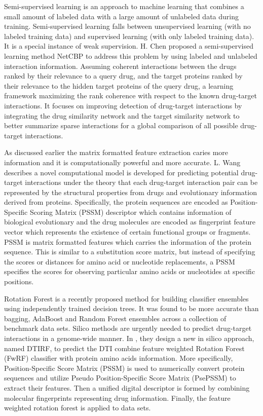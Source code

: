 \documentclass[conference]{IEEEtran}
\begin{document}
Semi-supervised learning is an approach to machine learning that combines a small amount of labeled data with a large amount of unlabeled data during training. Semi-supervised learning falls between unsupervised learning (with no labeled training data) and supervised learning (with only labeled training data). It is a special instance of weak supervision. H. Chen \cite{b1} proposed a semi-supervised learning method NetCBP to address this problem by using labeled and unlabeled interaction information. Assuming coherent interactions between the drugs ranked by their relevance to a query drug, and the target proteins ranked by their relevance to the hidden target proteins of the query drug, a learning framework maximizing the rank coherence with respect to the known drug-target interactions. It focuses on improving detection of drug-target interactions by integrating the drug similarity network and the target similarity network to better summarize sparse interactions for a global comparison of all possible drug-target interactions.

As discussed earlier the matrix formatted feature extraction caries more information and it is computationally powerful and more accurate. L. Wang \cite{b5} describes a novel computational model is developed for predicting potential drug-target interactions under the theory that each drug-target interaction pair can be represented by the structural properties from drugs and evolutionary information derived from proteins. Specifically, the protein sequences are encoded as Position-Specific Scoring Matrix (PSSM) descriptor which contains information of biological evolutionary and the drug molecules are encoded as fingerprint feature vector which represents the existence of certain functional groups or fragments. PSSM is matrix formatted features which carries the information of the protein sequence. This is similar to a substitution score matrix, but instead of specifying the scores or distances for amino acid or nucleotide replacements, a PSSM specifies the scores for observing particular amino acids or nucleotides at specific positions.

Rotation Forest is a recently proposed method for building classifier ensembles using independently trained decision trees. It was found to be more accurate than bagging, AdaBoost and Random Forest ensembles across a collection of benchmark data sets. Silico methods are urgently needed to predict drug-target interactions in a genome-wide manner. In \cite{b16}, they design a new in silico approach, named DTIRF, to predict the DTI combine feature weighted Rotation Forest (FwRF) classifier with protein amino acids information. More specifically, Position-Specific Score Matrix (PSSM) is used to numerically convert protein sequences and utilize Pseudo Position-Specific Score Matrix (PsePSSM) to extract their features. Then a unified digital descriptor is formed by combining molecular fingerprints representing drug information. Finally, the feature weighted rotation forest is applied to data sets.
\end{document}
